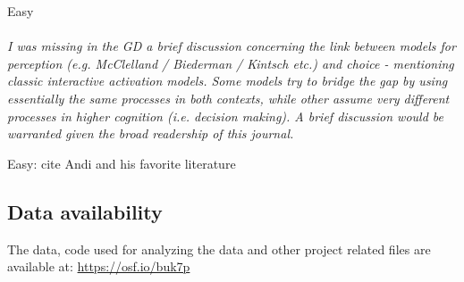 \documentclass[english,natbib,man,floatsintext]{apa6}
\newcommand\eatpunct[1]{}
\newcommand{\com}[2][]{\vspace{5mm}\paragraph[ ]{ \eatpunct}\label{#1}\emph{#2}\vspace{5mm}}
\begin{document}
Easy 


\com[com-r3-XX]{I was missing in the GD a brief discussion concerning the link between models for perception (e.g. McClelland / Biederman / Kintsch etc.) and choice - mentioning classic interactive activation models. Some models try to bridge the gap by using essentially the same processes in both contexts, while other assume very different processes in higher cognition (i.e. decision making). A brief discussion would be warranted given the broad readership of this journal.}

Easy: cite Andi and his favorite literature


\clearpage



\doublespacing
\setcounter{page}{1}
\setcounter{secnumdepth}{0}
\linenumbers

\maketitle






\subsection{Data availability}
The data, code used for analyzing the data and other project related files are available at: \url{https://osf.io/buk7p} %





\clearpage


\end{document}
